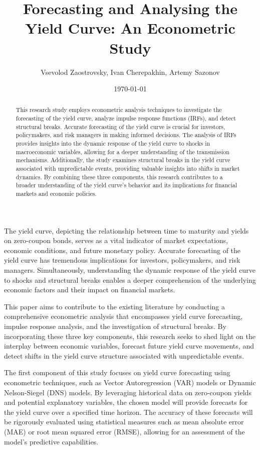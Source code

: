 \documentclass{vegaarticle}
\author{Vsevolod Zaostrovsky, Ivan Cherepakhin, Artemy Sazonov}
\title{Forecasting and Analysing the Yield Curve: An Econometric Study}
\date{\today}
\begin{document}
    \maketitle

    \begin{abstract}{}
        This research study employs econometric analysis techniques to investigate the forecasting of the yield curve,
        analyze impulse response functions (IRFs), and detect structural breaks. Accurate forecasting of the yield curve
        is crucial for investors, policymakers, and risk managers in making informed decisions. The analysis of IRFs
        provides insights into the dynamic response of the yield curve to shocks in macroeconomic variables, allowing
        for a deeper understanding of the transmission mechanisms. Additionally, the study examines structural breaks in
        the yield curve associated with unpredictable events, providing valuable insights into shifts in market
        dynamics. By combining these three components, this research contributes to a broader understanding of the yield
        curve's behavior and its implications for financial markets and economic policies.
    \end{abstract}

    \introduction
        The yield curve, depicting the relationship between time to maturity and yields on zero-coupon bonds, serves as
        a vital indicator of market expectations, economic conditions, and future monetary policy. Accurate forecasting
        of the yield curve has tremendous implications for investors, policymakers, and risk managers. Simultaneously,
        understanding the dynamic response of the yield curve to shocks and structural breaks enables a deeper
        comprehension of the underlying economic factors and their impact on financial markets.

        This paper aims to contribute to the existing literature by conducting a comprehensive econometric analysis that
        encompasses yield curve forecasting, impulse response analysis, and the investigation of structural breaks. By
        incorporating these three key components, this research seeks to shed light on the interplay between economic
        variables, forecast future yield curve movements, and detect shifts in the yield curve structure associated with
        unpredictable events.
        
        The first component of this study focuses on yield curve forecasting using econometric techniques, such as
        Vector Autoregression (VAR) models or Dynamic Nelson-Siegel (DNS) models. By leveraging historical data on
        zero-coupon yields and potential explanatory variables, the chosen model will provide forecasts for the yield
        curve over a specified time horizon. The accuracy of these forecasts will be rigorously evaluated using
        statistical measures such as mean absolute error (MAE) or root mean squared error (RMSE), allowing for an
        assessment of the model's predictive capabilities.
        
\end{document}
